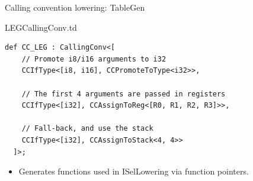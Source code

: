 
\begin{frame}[fragile]{Calling convention lowering: TableGen}

\begin{block}{LEGCallingConv.td}
\begin{lstlisting}
def CC_LEG : CallingConv<[
    // Promote i8/i16 arguments to i32
    CCIfType<[i8, i16], CCPromoteToType<i32>>,

    // The first 4 arguments are passed in registers
    CCIfType<[i32], CCAssignToReg<[R0, R1, R2, R3]>>,

    // Fall-back, and use the stack
    CCIfType<[i32], CCAssignToStack<4, 4>>
  ]>;
\end{lstlisting}
\end{block}

\begin{itemize}
    \item Generates functions used in ISelLowering via function pointers.
\end{itemize}

\end{frame}


